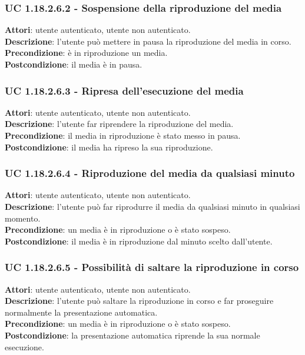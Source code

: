 	\subsubsection{UC 1.18.2.6.2 - Sospensione della riproduzione del media}{
		\label{uc1.18.2.6.2}
		\textbf{Attori}: utente autenticato, utente non autenticato. \\
		\textbf{Descrizione}: l'utente può mettere in pausa la riproduzione del media in corso. \\
		\textbf{Precondizione}: è in riproduzione un media.	\\
		\textbf{Postcondizione}: il media è in pausa.	\\
	}
	\subsubsection{UC 1.18.2.6.3 - Ripresa dell'esecuzione del media}{
		\label{uc1.18.2.6.3}
		\textbf{Attori}: utente autenticato, utente non autenticato. \\
		\textbf{Descrizione}: l'utente far riprendere la riproduzione del media. \\
		\textbf{Precondizione}: il media in riproduzione è stato messo in pausa.	\\
		\textbf{Postcondizione}: il media ha ripreso la sua riproduzione.	\\
	}
	\subsubsection{UC 1.18.2.6.4 - Riproduzione del media da qualsiasi minuto}{
		\label{uc1.18.2.6.4}
		\textbf{Attori}: utente autenticato, utente non autenticato. \\
		\textbf{Descrizione}: l'utente può far riprodurre il media da qualsiasi minuto in qualsiasi momento. \\
		\textbf{Precondizione}: un media è in riproduzione o è stato sospeso.	\\
		\textbf{Postcondizione}: il media è in riproduzione dal minuto scelto dall'utente.	\\
	}
	\subsubsection{UC 1.18.2.6.5 - Possibilità di saltare la riproduzione in corso}{
		\label{uc1.18.2.6.5}
		\textbf{Attori}: utente autenticato, utente non autenticato. \\
		\textbf{Descrizione}: l'utente può saltare la riproduzione in corso e far proseguire normalmente la presentazione automatica. \\
		\textbf{Precondizione}: un media è in riproduzione o è stato sospeso.	\\
		\textbf{Postcondizione}: la presentazione automatica riprende la sua normale esecuzione.	\\
	}
